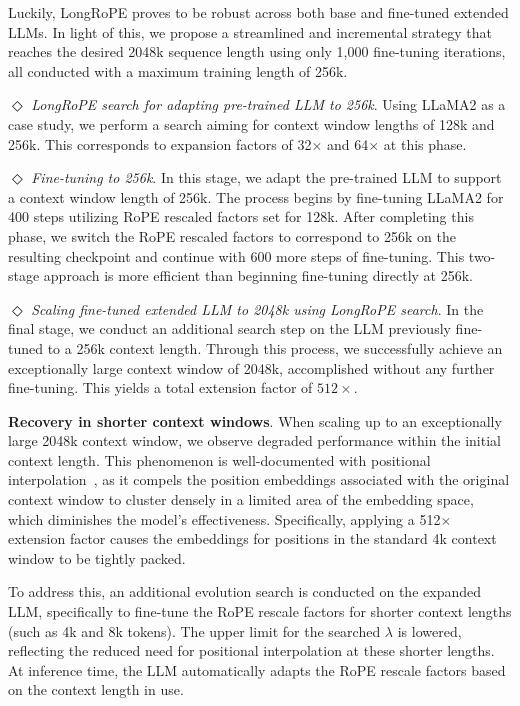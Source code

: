 Luckily, LongRoPE proves to be robust across both base and fine-tuned extended LLMs. In light of this, we propose a streamlined and incremental strategy that reaches the desired 2048k sequence length using only 1,000 fine-tuning iterations, all conducted with a maximum training length of 256k.

$\Diamond$ \textit{LongRoPE search for adapting pre-trained LLM to 256k}. Using LLaMA2 as a case study, we perform a search aiming for context window lengths of 128k and 256k. This corresponds to expansion factors of 32$\times$ and 64$\times$ at this phase.

$\Diamond$ \textit{Fine-tuning to 256k}. In this stage, we adapt the pre-trained LLM to support a context window length of 256k. The process begins by fine-tuning LLaMA2 for 400 steps utilizing RoPE rescaled factors set for 128k. After completing this phase, we switch the RoPE rescaled factors to correspond to 256k on the resulting checkpoint and continue with 600 more steps of fine-tuning. This two-stage approach is more efficient than beginning fine-tuning directly at 256k.

$\Diamond$ \textit{Scaling fine-tuned extended LLM to 2048k using LongRoPE search}. In the final stage, we conduct an additional search step on the LLM previously fine-tuned to a 256k context length. Through this process, we successfully achieve an exceptionally large context window of 2048k, accomplished without any further fine-tuning. This yields a total extension factor of $512\times$.

\textbf{Recovery in shorter context windows}. When scaling up to an exceptionally large 2048k context window, we observe degraded performance within the initial context length. This phenomenon is well-documented with positional interpolation~\cite{pi}, as it compels the position embeddings associated with the original context window to cluster densely in a limited area of the embedding space, which diminishes the model's effectiveness. Specifically, applying a 512$\times$ extension factor causes the embeddings for positions in the standard 4k context window to be tightly packed.

To address this, an additional evolution search is conducted on the expanded LLM, specifically to fine-tune the RoPE rescale factors for shorter context lengths (such as 4k and 8k tokens). The upper limit for the searched $\lambda$ is lowered, reflecting the reduced need for positional interpolation at these shorter lengths. At inference time, the LLM automatically adapts the RoPE rescale factors based on the context length in use.

